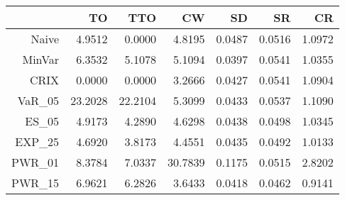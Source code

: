 \begin{tabular}{rrrrrrr}
  \toprule
 & TO & TTO & CW & SD & SR & CR \\ 
  \midrule
Naive & 4.9512 & 0.0000 & 4.8195 & 0.0487 & 0.0516 & 1.0972 \\ 
  MinVar & 6.3532 & 5.1078 & 5.1094 & 0.0397 & 0.0541 & 1.0355 \\ 
  CRIX & 0.0000 & 0.0000 & 3.2666 & 0.0427 & 0.0541 & 1.0904 \\ 
  VaR\_05 & 23.2028 & 22.2104 & 5.3099 & 0.0433 & 0.0537 & 1.1090 \\ 
  ES\_05 & 4.9173 & 4.2890 & 4.6298 & 0.0438 & 0.0498 & 1.0345 \\ 
  EXP\_25 & 4.6920 & 3.8173 & 4.4551 & 0.0435 & 0.0492 & 1.0133 \\ 
  PWR\_01 & 8.3784 & 7.0337 & 30.7839 & 0.1175 & 0.0515 & 2.8202 \\ 
  PWR\_15 & 6.9621 & 6.2826 & 3.6433 & 0.0418 & 0.0462 & 0.9141 \\ 
   \bottomrule
\end{tabular}
